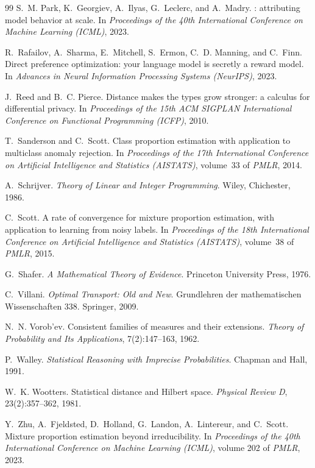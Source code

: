 \documentclass[11pt]{article}
\theoremstyle{definition}
\theoremstyle{remark}
\begin{document}
\begin{thebibliography}{99}
S.~M. Park, K.~Georgiev, A.~Ilyas, G.~Leclerc, and A.~Madry.
: attributing model behavior at scale.
\newblock In \emph{Proceedings of the 40th International Conference on Machine Learning (ICML)}, 2023.

R.~Rafailov, A.~Sharma, E.~Mitchell, S.~Ermon, C.~D. Manning, and C.~Finn.
\newblock Direct preference optimization: your language model is secretly a reward model.
\newblock In \emph{Advances in Neural Information Processing Systems (NeurIPS)}, 2023.

J.~Reed and B.~C. Pierce.
\newblock Distance makes the types grow stronger: a calculus for differential privacy.
\newblock In \emph{Proceedings of the 15th ACM SIGPLAN International Conference on Functional
  Programming (ICFP)}, 2010.

T.~Sanderson and C.~Scott.
\newblock Class proportion estimation with application to multiclass anomaly rejection.
\newblock In \emph{Proceedings of the 17th International Conference on Artificial Intelligence and
  Statistics (AISTATS)}, volume~33 of \emph{PMLR}, 2014.

A.~Schrijver.
\newblock \emph{Theory of Linear and Integer Programming}.
\newblock Wiley, Chichester, 1986.

C.~Scott.
\newblock A rate of convergence for mixture proportion estimation, with application to learning from
  noisy labels.
\newblock In \emph{Proceedings of the 18th International Conference on Artificial Intelligence and
  Statistics (AISTATS)}, volume~38 of \emph{PMLR}, 2015.

G.~Shafer.
\newblock \emph{A Mathematical Theory of Evidence}.
\newblock Princeton University Press, 1976.

C.~Villani.
\newblock \emph{Optimal Transport: Old and New}.
\newblock Grundlehren der mathematischen Wissenschaften 338. Springer, 2009.

N.~N. Vorob'ev.
\newblock Consistent families of measures and their extensions.
\newblock \emph{Theory of Probability and Its Applications}, 7(2):147--163, 1962.

P.~Walley.
\newblock \emph{Statistical Reasoning with Imprecise Probabilities}.
\newblock Chapman and Hall, 1991.

W.~K. Wootters.
\newblock Statistical distance and {H}ilbert space.
\newblock \emph{Physical Review D}, 23(2):357--362, 1981.

Y.~Zhu, A.~Fjeldsted, D.~Holland, G.~Landon, A.~Lintereur, and C.~Scott.
\newblock Mixture proportion estimation beyond irreducibility.
\newblock In \emph{Proceedings of the 40th International Conference on Machine Learning (ICML)},
  volume 202 of \emph{PMLR}, 2023.

\end{thebibliography}
\end{document}
